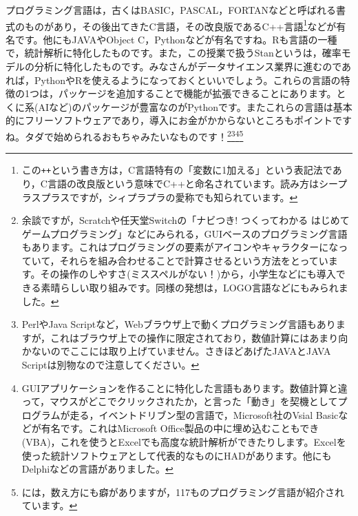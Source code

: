 \documentclass{ltjsbook}
\begin{document}
プログラミング言語は，古くはBASIC，PASCAL，FORTANなどと呼ばれる書式のものがあり，その後出てきたC言語，その改良版であるC++言語\footnote{この\verb|++|という書き方は，C言語特有の「変数に1加える」という表記法であり，C言語の改良版という意味でC++と命名されています。読み方はシープラスプラスですが，シィプラプラの愛称でも知られています。}などが有名です。他にもJAVAやObject C，Pythonなどが有名ですね。Rも言語の一種で，統計解析に特化したものです。また，この授業で扱うStanというは，確率モデルの分析に特化したものです。みなさんがデータサイエンス業界に進むのであれば，PythonやRを使えるようになっておくといいでしょう。これらの言語の特徴の1つは，パッケージを追加することで機能が拡張できることにあります。とくに系(AIなど)のパッケージが豊富なのがPythonです。またこれらの言語は基本的にフリーソフトウェアであり，導入にお金がかからないところもポイントですね。タダで始められるおもちゃみたいなものです！\footnote{余談ですが，Scratchや任天堂Switchの「ナビつき! つくってわかる はじめてゲームプログラミング」などにみられる，GUIベースのプログラミング言語もあります。これはプログラミングの要素がアイコンやキャラクターになっていて，それらを組み合わせることで計算させるという方法をとっています。その操作のしやすさ(ミススペルがない！)から，小学生などにも導入できる素晴らしい取り組みです。同様の発想は，LOGO言語などにもみられました。}\footnote{PerlやJava Scriptなど，Webブラウザ上で動くプログラミング言語もありますが，これはブラウザ上での操作に限定されており，数値計算にはあまり向かないのでここには取り上げていません。さきほどあげたJAVAとJAVA Scriptは別物なので注意してください。}\footnote{GUIアプリケーションを作ることに特化した言語もあります。数値計算と違って，マウスがどこでクリックされたか，と言った「動き」を契機としてプログラムが走る，イベントドリブン型の言語で，Microsoft社のVsial Basicなどが有名です。これはMicrosoft Office製品の中に埋め込むこともでき(VBA)，これを使うとExcelでも高度な統計解析ができたりします。Excelを使った統計ソフトウェアとして代表的なものにHADがあります\citep{HAD}。他にもDelphiなどの言語がありました。}\footnote{\citep{Language2016}には，数え方にも癖がありますが，117ものプログラミング言語が紹介されています。}
\end{document}

